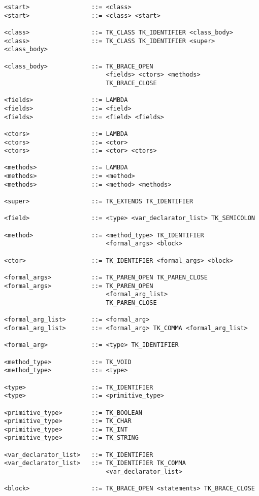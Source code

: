 \documentclass [a4paper,titlepage]{report}
\begin{document}
\begin{verbatim}
<start>                 ::= <class>
<start>                 ::= <class> <start>

<class>                 ::= TK_CLASS TK_IDENTIFIER <class_body>
<class>                 ::= TK_CLASS TK_IDENTIFIER <super> <class_body>

<class_body>            ::= TK_BRACE_OPEN 
                            <fields> <ctors> <methods> 
                            TK_BRACE_CLOSE

<fields>                ::= LAMBDA
<fields>                ::= <field>
<fields>                ::= <field> <fields>

<ctors>                 ::= LAMBDA
<ctors>                 ::= <ctor>
<ctors>                 ::= <ctor> <ctors>

<methods>               ::= LAMBDA
<methods>               ::= <method>
<methods>               ::= <method> <methods>

<super>                 ::= TK_EXTENDS TK_IDENTIFIER

<field>                 ::= <type> <var_declarator_list> TK_SEMICOLON

<method>                ::= <method_type> TK_IDENTIFIER 
                            <formal_args> <block>

<ctor>                  ::= TK_IDENTIFIER <formal_args> <block>

<formal_args>           ::= TK_PAREN_OPEN TK_PAREN_CLOSE
<formal_args>           ::= TK_PAREN_OPEN 
                            <formal_arg_list> 
                            TK_PAREN_CLOSE

<formal_arg_list>       ::= <formal_arg>
<formal_arg_list>       ::= <formal_arg> TK_COMMA <formal_arg_list>

<formal_arg>            ::= <type> TK_IDENTIFIER

<method_type>           ::= TK_VOID
<method_type>           ::= <type>

<type>                  ::= TK_IDENTIFIER
<type>                  ::= <primitive_type>

<primitive_type>        ::= TK_BOOLEAN
<primitive_type>        ::= TK_CHAR
<primitive_type>        ::= TK_INT
<primitive_type>        ::= TK_STRING

<var_declarator_list>   ::= TK_IDENTIFIER
<var_declarator_list>   ::= TK_IDENTIFIER TK_COMMA 
                            <var_declarator_list>

<block>                 ::= TK_BRACE_OPEN <statements> TK_BRACE_CLOSE


\end{verbatim}
\end{document}
